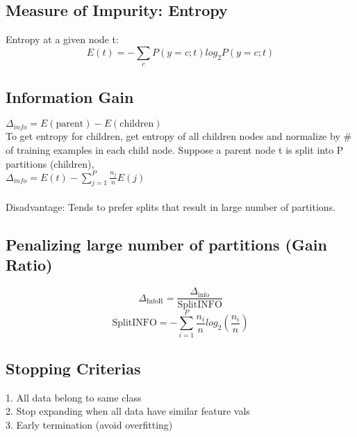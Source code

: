\subsection*{Measure of Impurity: Entropy}
Entropy at a given node t:\\
\[E(t) = -\sum_c P(y=c;t)log_2P(y=c;t)\]
\subsection*{Information Gain}
$\Delta_{info}=E(\text{parent}) - E(\text{children})$
\\
To get entropy for children, get entropy of all children nodes and 
normalize by \# of training examples in each child node. Suppose a parent 
node t is split into P partitions (children),\\
$\Delta_{info}=E(t) - \sum^{P}_{j=1}\frac{n_j}{n}E(j)$\\\\
Disadvantage: Tends to prefer splits that result in large number of partitions.
\subsection*{Penalizing large number of partitions (Gain Ratio)}
\[\Delta_{\text{InfoR}} = \frac{\Delta_{\text{info}}}{\text{SplitINFO}}\]
\[\text{SplitINFO} = -\sum^{P}_{i=1}\frac{n_i}{n}log_2(\frac{n_i}{n})\]
\subsection*{Stopping Criterias}
1. All data belong to same class\\
2. Stop expanding when all data have similar feature vals\\
3. Early termination (avoid overfitting)